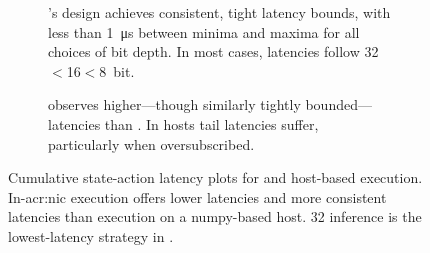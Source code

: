 \begin{figure}
	\centering
	\begin{subfigure}{\linewidth}
		\caption{\approachshort's \Coopfw{} design achieves consistent, tight latency bounds, with less than \qty{1}{\micro\second} between minima and maxima for all choices of bit depth. In most cases, latencies follow 32$<$16$<$\qty{8}{bit}.}
	\end{subfigure}

	\begin{subfigure}{\linewidth}
		\caption{\indfw{} observes higher---though similarly tightly bounded---latencies than \coopfw. In hosts tail latencies suffer, particularly when oversubscribed.}
	\end{subfigure}
	\caption[Cumulative state-action latency plots for \approachshort{} and host-based execution.]{Cumulative state-action latency plots for \approachshort{} and host-based execution. In-\gls{acr:nic} execution offers lower latencies and more consistent latencies than execution on a numpy-based host. \qty{32}{\bit} inference is the lowest-latency strategy in \approachshort{}.\label{fig:lat-cumul}}
\end{figure}

